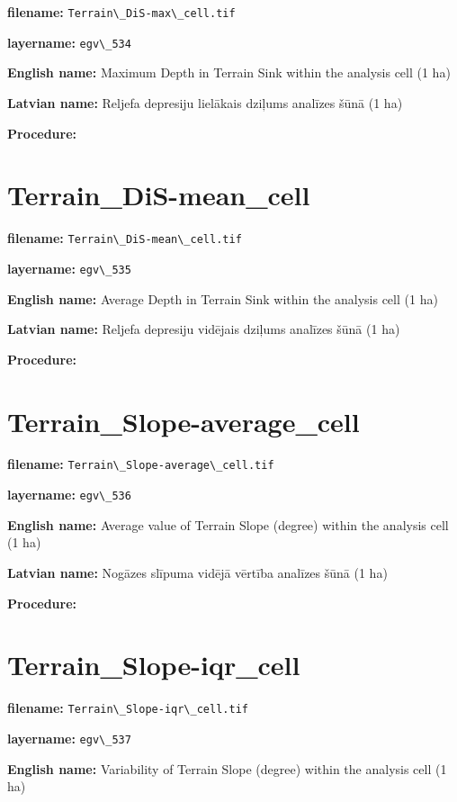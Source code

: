 \documentclass[
]{book}
\newcommand{\passthrough}[1]{#1}
\begin{document}
\textbf{filename:} \passthrough{\lstinline!Terrain\_DiS-max\_cell.tif!}

\textbf{layername:} \passthrough{\lstinline!egv\_534!}

\textbf{English name:} Maximum Depth in Terrain Sink within the analysis cell (1 ha)

\textbf{Latvian name:} Reljefa depresiju lielākais dziļums analīzes šūnā (1 ha)

\textbf{Procedure:}

\section{Terrain\_DiS-mean\_cell}\label{ch06.535}

\textbf{filename:} \passthrough{\lstinline!Terrain\_DiS-mean\_cell.tif!}

\textbf{layername:} \passthrough{\lstinline!egv\_535!}

\textbf{English name:} Average Depth in Terrain Sink within the analysis cell (1 ha)

\textbf{Latvian name:} Reljefa depresiju vidējais dziļums analīzes šūnā (1 ha)

\textbf{Procedure:}

\section{Terrain\_Slope-average\_cell}\label{ch06.536}

\textbf{filename:} \passthrough{\lstinline!Terrain\_Slope-average\_cell.tif!}

\textbf{layername:} \passthrough{\lstinline!egv\_536!}

\textbf{English name:} Average value of Terrain Slope (degree) within the analysis cell (1 ha)

\textbf{Latvian name:} Nogāzes slīpuma vidējā vērtība analīzes šūnā (1 ha)

\textbf{Procedure:}

\section{Terrain\_Slope-iqr\_cell}\label{ch06.537}

\textbf{filename:} \passthrough{\lstinline!Terrain\_Slope-iqr\_cell.tif!}

\textbf{layername:} \passthrough{\lstinline!egv\_537!}

\textbf{English name:} Variability of Terrain Slope (degree) within the analysis cell (1 ha)
\end{document}
